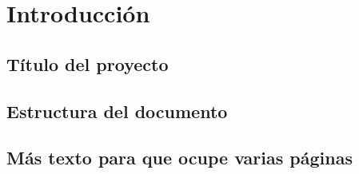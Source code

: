 \chapter{Introducción}



\section{Título del proyecto}




\section{Estructura del documento}




\section{Más texto para que ocupe varias páginas}


